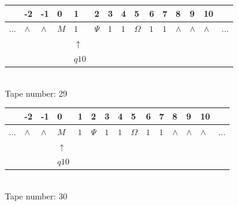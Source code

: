 \documentclass[11pt]{article}
\begin{document}
\begin{table}[H]
\centering
\begin{tabular}{lllllllllllllll}
 & -2 & -1 & 0 & 1 & 2 & 3 & 4 & 5 & 6 & 7 & 8 & 9 & 10 & \\
\hline
$...$ & \multicolumn{1}{|l|}{$\wedge$} & \multicolumn{1}{|l|}{$\wedge$} & \multicolumn{1}{|l|}{$M$} & \multicolumn{1}{|l|}{$1$} & \multicolumn{1}{|l|}{$\Psi$} & \multicolumn{1}{|l|}{$1$} & \multicolumn{1}{|l|}{$1$} & \multicolumn{1}{|l|}{$\Omega$} & \multicolumn{1}{|l|}{$1$} & \multicolumn{1}{|l|}{$1$} & \multicolumn{1}{|l|}{$\wedge$} & \multicolumn{1}{|l|}{$\wedge$} & \multicolumn{1}{|l|}{$\wedge$} & $...$\\
\hline
&  &  &  & $\uparrow$ &  &  &  &  &  &  &  &  &  &  \\
&  &  &  & $ q10 $ &  &  &  &  &  &  &  &  &  &  \\
\end{tabular}
\\
Tape number: 29
\noindent\makebox[\linewidth]{\hdashrule{\textwidth}{1pt}{1pt}}\end{table}
\clearpage

\begin{table}[H]
\centering
\begin{tabular}{lllllllllllllll}
 & -2 & -1 & 0 & 1 & 2 & 3 & 4 & 5 & 6 & 7 & 8 & 9 & 10 & \\
\hline
$...$ & \multicolumn{1}{|l|}{$\wedge$} & \multicolumn{1}{|l|}{$\wedge$} & \multicolumn{1}{|l|}{$M$} & \multicolumn{1}{|l|}{$1$} & \multicolumn{1}{|l|}{$\Psi$} & \multicolumn{1}{|l|}{$1$} & \multicolumn{1}{|l|}{$1$} & \multicolumn{1}{|l|}{$\Omega$} & \multicolumn{1}{|l|}{$1$} & \multicolumn{1}{|l|}{$1$} & \multicolumn{1}{|l|}{$\wedge$} & \multicolumn{1}{|l|}{$\wedge$} & \multicolumn{1}{|l|}{$\wedge$} & $...$\\
\hline
&  &  & $\uparrow$ &  &  &  &  &  &  &  &  &  &  &  \\
&  &  & $ q10 $ &  &  &  &  &  &  &  &  &  &  &  \\
\end{tabular}
\\
Tape number: 30
\noindent\makebox[\linewidth]{\hdashrule{\textwidth}{1pt}{1pt}}\end{table}
\end{document}
